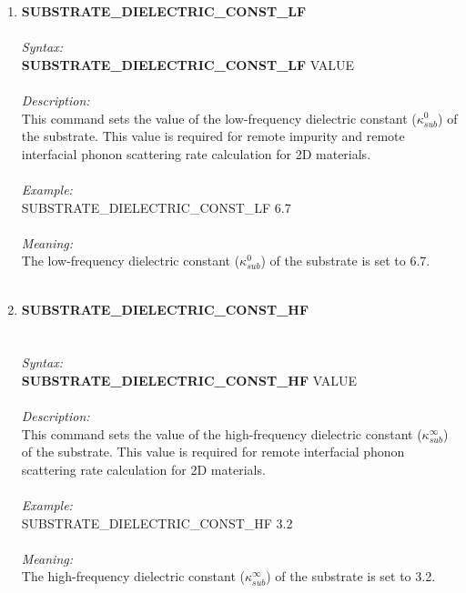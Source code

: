 \documentclass[12pt]{article}
\begin{document}
\begin{enumerate}
    \item \textbf{SUBSTRATE\_DIELECTRIC\_CONST\_LF} \\  \\
    \textit{Syntax:} \\
    \textbf{SUBSTRATE\_DIELECTRIC\_CONST\_LF} VALUE \\ \\
    \textit{Description:} \\
    This command sets the value of the low-frequency dielectric constant ($\kappa_{sub}^0$) of the substrate. This value is required for remote impurity and remote interfacial phonon scattering rate calculation for 2D materials. \\ \\
    \textit{Example:} \\
    SUBSTRATE\_DIELECTRIC\_CONST\_LF 6.7 \\ \\
    \textit{Meaning:} \\    
    The low-frequency dielectric constant ($\kappa_{sub}^0$) of the substrate is set to 6.7. \\ \\ 
    
    \item \textbf{SUBSTRATE\_DIELECTRIC\_CONST\_HF}  \\ \\ \\
    \textit{Syntax:} \\
    \textbf{SUBSTRATE\_DIELECTRIC\_CONST\_HF} VALUE \\ \\
    \textit{Description:} \\
    This command sets the value of the high-frequency dielectric constant ($\kappa_{sub}^{\infty}$) of the substrate. This value is required for remote interfacial phonon scattering rate calculation for 2D materials. \\ \\
    \textit{Example:} \\
    SUBSTRATE\_DIELECTRIC\_CONST\_HF 3.2 \\ \\
    \textit{Meaning:} \\    
    The high-frequency dielectric constant ($\kappa_{sub}^{\infty}$) of the substrate is set to 3.2. \\ \\
    

\end{enumerate}
\end{document}
